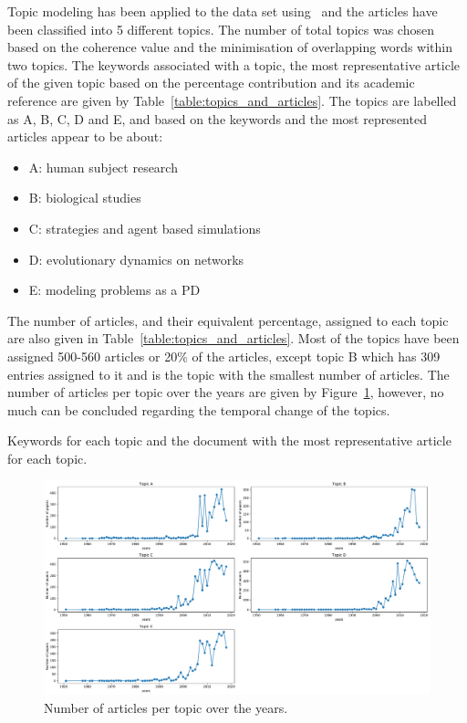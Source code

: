 \documentclass{article}
\theoremstyle{definition}
\newcommand{\totalarticles}{}
\begin{document}
Topic modeling has been applied to the data set using~\cite{rehurek_lrec} and
the \totalarticles articles have been classified into 5 different topics. The
number of total topics was chosen based on the coherence value and the
minimisation of overlapping words within two topics. The keywords associated
with a topic, the most representative article of the given topic based on the percentage
contribution and its academic reference are given by
Table~\ref{table:topics_and_articles}. The topics are labelled as A, B, C, D and
E, and based on the keywords and the most represented articles appear to be about:

\begin{itemize}
    \item A: human subject research
    \item B: biological studies
    \item C: strategies and agent based simulations
    \item D: evolutionary dynamics on networks
    \item E: modeling problems as a PD
\end{itemize}

The number of articles, and their equivalent percentage, assigned to each topic
are also given in Table~\ref{table:topics_and_articles}. Most of the topics have
been assigned 500-560 articles or 20\% of the articles, except topic B which has
309 entries assigned to it and is the topic with the smallest number of articles.
The number of articles per topic over the years are given by
Figure~\ref{fig:number_of_articles_per_topic}, however, no much can be concluded
regarding the temporal change of the topics.

\begin{table}[!hbtp]
    \begin{center}
    \resizebox{\textwidth}{!}{
    }
    \end{center}
    \caption{Keywords for each topic and the document with the most representative article for each topic.}
    \label{table:topics_and_articles}
\end{table}

\begin{figure}[!hbtp]
    \centering
    \includegraphics[width=\textwidth]{./assets/images/papers_per_topic_over_time.pdf}
    \caption{Number of articles per topic over the years.}\label{fig:number_of_articles_per_topic}
\end{figure}
\end{document}
